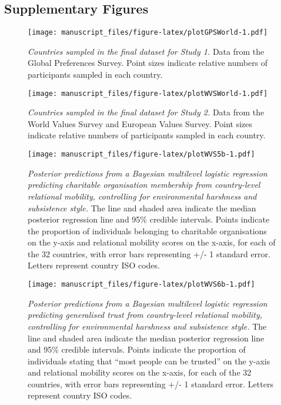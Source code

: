 \documentclass[
  man,floatsintext]{apa6}
\begin{document}
\newpage

\hypertarget{supplementary-figures}{%
\subsection{Supplementary Figures}\label{supplementary-figures}}



\begin{figure}
\centering
\texttt{[image: manuscript\_files/figure-latex/plotGPSWorld-1.pdf]}
\caption{\label{fig:plotGPSWorld}\emph{Countries sampled in the final dataset for Study 1.} Data from the Global Preferences Survey. Point sizes indicate relative numbers of participants sampled in each country.}
\end{figure}

\newpage



\begin{figure}
\centering
\texttt{[image: manuscript\_files/figure-latex/plotWVSWorld-1.pdf]}
\caption{\label{fig:plotWVSWorld}\emph{Countries sampled in the final dataset for Study 2.} Data from the World Values Survey and European Values Survey. Point sizes indicate relative numbers of participants sampled in each country.}
\end{figure}

\newpage



\begin{figure}
\centering
\texttt{[image: manuscript\_files/figure-latex/plotWVS5b-1.pdf]}
\caption{\label{fig:plotWVS5b}\emph{Posterior predictions from a Bayesian multilevel logistic regression predicting charitable organisation membership from country-level relational mobility, controlling for environmental harshness and subsistence style.} The line and shaded area indicate the median posterior regression line and 95\% credible intervals. Points indicate the proportion of individuals belonging to charitable organisations on the y-axis and relational mobility scores on the x-axis, for each of the 32 countries, with error bars representing +/- 1 standard error. Letters represent country ISO codes.}
\end{figure}

\newpage



\begin{figure}
\centering
\texttt{[image: manuscript\_files/figure-latex/plotWVS6b-1.pdf]}
\caption{\label{fig:plotWVS6b}\emph{Posterior predictions from a Bayesian multilevel logistic regression predicting generalised trust from country-level relational mobility, controlling for environmental harshness and subsistence style.} The line and shaded area indicate the median posterior regression line and 95\% credible intervals. Points indicate the proportion of individuals stating that ``most people can be trusted'' on the y-axis and relational mobility scores on the x-axis, for each of the 32 countries, with error bars representing +/- 1 standard error. Letters represent country ISO codes.}
\end{figure}
\end{document}
